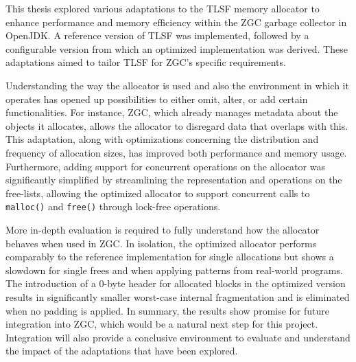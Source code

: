 
This thesis explored various adaptations to the TLSF memory allocator to enhance performance and memory efficiency within the ZGC garbage collector in OpenJDK. A reference version of TLSF was implemented, followed by a configurable version from which an optimized implementation was derived. These adaptations aimed to tailor TLSF for ZGC's specific requirements.

Understanding the way the allocator is used and also the environment in which it operates has opened up possibilities to either omit, alter, or add certain functionalities. For instance, ZGC, which already manages metadata about the objects it allocates, allows the allocator to disregard data that overlaps with this. This adaptation, along with optimizations concerning the distribution and frequency of allocation sizes, has improved both performance and memory usage. Furthermore, adding support for concurrent operations on the allocator was significantly simplified by streamlining the representation and operations on the free-lists, allowing the optimized allocator to support concurrent calls to \texttt{malloc()} and \texttt{free()} through lock-free operations.

More in-depth evaluation is required to fully understand how the allocator behaves when used in ZGC. In isolation, the optimized allocator performs comparably to the reference implementation for single allocations but shows a slowdown for single frees and when applying patterns from real-world programs. The introduction of a 0-byte header for allocated blocks in the optimized version results in significantly smaller worst-case internal fragmentation and is eliminated when no padding is applied. In summary, the results show promise for future integration into ZGC, which would be a natural next step for this project. Integration will also provide a conclusive environment to evaluate and understand the impact of the adaptations that have been explored.

